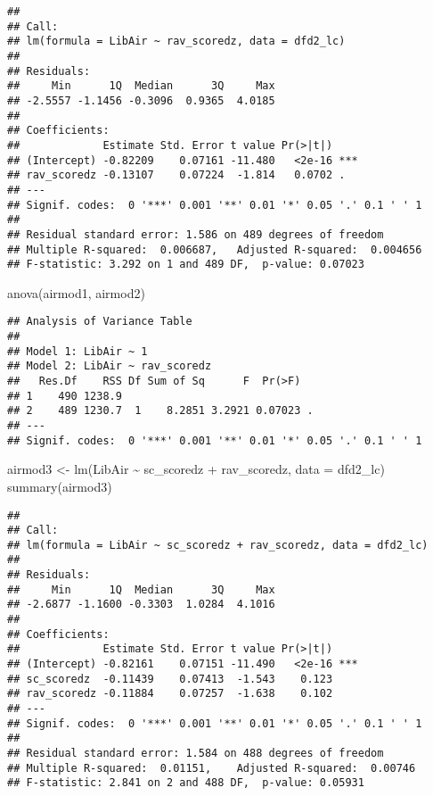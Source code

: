 \documentclass[
]{article}
\newenvironment{Shaded}{\begin{snugshade}}{\end{snugshade}}
\newcommand{\AttributeTok}[1]{\textcolor[rgb]{0.77,0.63,0.00}{#1}}
\newcommand{\FunctionTok}[1]{\textcolor[rgb]{0.00,0.00,0.00}{#1}}
\newcommand{\NormalTok}[1]{#1}
\newcommand{\OtherTok}[1]{\textcolor[rgb]{0.56,0.35,0.01}{#1}}
\newcommand{\SpecialCharTok}[1]{\textcolor[rgb]{0.00,0.00,0.00}{#1}}
\begin{document}
\begin{verbatim}
## 
## Call:
## lm(formula = LibAir ~ rav_scoredz, data = dfd2_lc)
## 
## Residuals:
##     Min      1Q  Median      3Q     Max 
## -2.5557 -1.1456 -0.3096  0.9365  4.0185 
## 
## Coefficients:
##             Estimate Std. Error t value Pr(>|t|)    
## (Intercept) -0.82209    0.07161 -11.480   <2e-16 ***
## rav_scoredz -0.13107    0.07224  -1.814   0.0702 .  
## ---
## Signif. codes:  0 '***' 0.001 '**' 0.01 '*' 0.05 '.' 0.1 ' ' 1
## 
## Residual standard error: 1.586 on 489 degrees of freedom
## Multiple R-squared:  0.006687,   Adjusted R-squared:  0.004656 
## F-statistic: 3.292 on 1 and 489 DF,  p-value: 0.07023
\end{verbatim}

\begin{Shaded}
\begin{Highlighting}[]
\FunctionTok{anova}\NormalTok{(airmod1, airmod2)}
\end{Highlighting}
\end{Shaded}

\begin{verbatim}
## Analysis of Variance Table
## 
## Model 1: LibAir ~ 1
## Model 2: LibAir ~ rav_scoredz
##   Res.Df    RSS Df Sum of Sq      F  Pr(>F)  
## 1    490 1238.9                              
## 2    489 1230.7  1    8.2851 3.2921 0.07023 .
## ---
## Signif. codes:  0 '***' 0.001 '**' 0.01 '*' 0.05 '.' 0.1 ' ' 1
\end{verbatim}

\begin{Shaded}
\begin{Highlighting}[]
\NormalTok{airmod3 }\OtherTok{\textless{}{-}} \FunctionTok{lm}\NormalTok{(LibAir }\SpecialCharTok{\textasciitilde{}}\NormalTok{ sc\_scoredz }\SpecialCharTok{+}\NormalTok{ rav\_scoredz, }\AttributeTok{data =}\NormalTok{ dfd2\_lc)}
\FunctionTok{summary}\NormalTok{(airmod3)}
\end{Highlighting}
\end{Shaded}

\begin{verbatim}
## 
## Call:
## lm(formula = LibAir ~ sc_scoredz + rav_scoredz, data = dfd2_lc)
## 
## Residuals:
##     Min      1Q  Median      3Q     Max 
## -2.6877 -1.1600 -0.3303  1.0284  4.1016 
## 
## Coefficients:
##             Estimate Std. Error t value Pr(>|t|)    
## (Intercept) -0.82161    0.07151 -11.490   <2e-16 ***
## sc_scoredz  -0.11439    0.07413  -1.543    0.123    
## rav_scoredz -0.11884    0.07257  -1.638    0.102    
## ---
## Signif. codes:  0 '***' 0.001 '**' 0.01 '*' 0.05 '.' 0.1 ' ' 1
## 
## Residual standard error: 1.584 on 488 degrees of freedom
## Multiple R-squared:  0.01151,    Adjusted R-squared:  0.00746 
## F-statistic: 2.841 on 2 and 488 DF,  p-value: 0.05931
\end{verbatim}
\end{document}
